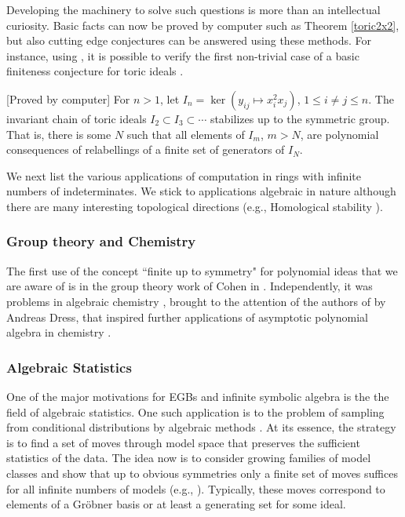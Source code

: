 Developing the machinery to solve such questions is more than an intellectual curiosity.  Basic facts can now be proved by computer such as Theorem \ref{toric2x2}, but also cutting edge conjectures can be answered using these methods.  For instance, using \cite{EquivariantGB}, it is possible to verify the first non-trivial case of a basic finiteness conjecture for toric ideals \cite{draisma2013noetherianity}.  

\begin{theorem}\label{monomthm}[Proved by computer]
For $n > 1$, let $I_n = \ker (y_{ij} \mapsto x_i^2 x_j)$, $1 \leq i \neq j \leq n$.  The invariant chain of toric ideals $I_2 \subset I_3 \subset \cdots$ stabilizes up to the symmetric group.  That is, there is some $N$ such that all elements of $I_m$, $m > N$, are polynomial consequences of relabellings of a finite set of generators of $I_N$.
\end{theorem}


We next list the various applications of computation in rings with infinite numbers of indeterminates.  
We stick to applications algebraic in nature although there are many interesting topological directions (e.g., Homological stability \cite{randal2013homological, church2012homological}).


\subsubsection{Group theory and Chemistry}

The first use of the concept ``finite up to symmetry" for polynomial ideas that we are aware of is in the group theory work of Cohen in \cite{cohen1967laws}.  
Independently, it was problems in algebraic chemistry \cite{ruch1967vandermondesche}, brought to the attention of the authors of \cite{aschenbrenner2007finite} by Andreas Dress, that inspired further applications of asymptotic polynomial algebra in chemistry \cite{Draisma08b}.

\subsubsection{Algebraic Statistics}

One of the major motivations for EGBs and infinite symbolic algebra is the the field of algebraic statistics.  One such application is to the problem of sampling from conditional distributions by algebraic methods \cite{diaconis1998algebraic}.  At its essence, the strategy is to find a set of moves through model space that preserves the sufficient statistics of the data.   The idea now is to consider growing families of model classes and show that up to obvious symmetries only a finite set of moves suffices for all infinite numbers of models (e.g., \cite{aoki2003minimal, santos2003higher, hocsten2007finiteness, drton2007algebraic, Draisma08b, Brouwer09e, draisma2009ideals, hillar2012finite, draisma2015finiteness}).  Typically, these moves correspond to elements of a Gr\"obner basis or at least a generating set for some ideal.

